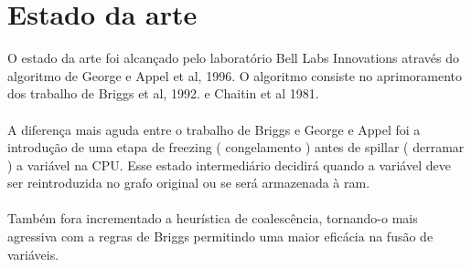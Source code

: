 \section{Estado da arte}

O estado da arte foi alcançado pelo laboratório Bell Labs Innovations através do algoritmo de George e Appel et al, 1996.
O algoritmo consiste no aprimoramento dos trabalho de Briggs et al, 1992. e Chaitin et al 1981.
\\
\\
A diferença mais aguda entre o trabalho de Briggs e George e Appel foi a introdução de uma etapa de freezing ( congelamento ) antes de spillar ( derramar ) a variável na CPU. Esse estado intermediário decidirá quando a variável deve ser reintroduzida no grafo original ou se será armazenada à ram.
\\
\\
Também fora incrementado a heurística de coalescência, tornando-o mais agressiva com a regras de Briggs permitindo uma maior eficácia na fusão de variáveis. 